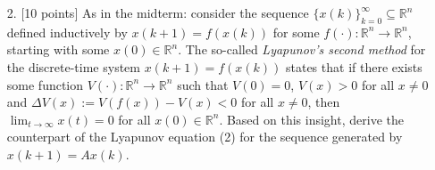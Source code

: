\documentclass[a4paper,10.5pt]{article}
\begin{document}
\begin{itemize}
\item[2.] $[$10 points$]$ As in the midterm: consider the sequence $\{x(k)\}_{k=0}^\infty \subseteq \mathbb{R}^n$ defined inductively by 
$x(k+1)=f(x(k))$ for some $f(\cdot):\mathbb{R}^n \rightarrow \mathbb{R}^n$, starting with some $x(0)\in \mathbb{R}^n$. The so-called \emph{Lyapunov's second method} for the discrete-time system $x(k+1)=f(x(k))$ states that if there exists some function $V(\cdot):\mathbb{R}^n \rightarrow \mathbb{R}^n$ such that $V(0)=0$, $V(x) > 0$ for all $x\neq 0$ and $\Delta V(x):=V(f(x)) - V(x)<0$ for all $x\neq 0$, then $\lim_{t \rightarrow \infty} x(t) =0$ for all $x(0) \in \mathbb{R}^n$. Based on this insight, derive the counterpart of the Lyapunov equation (2) for the sequence generated by $x(k+1)=Ax(k)$.
\end{itemize}
\end{document}
